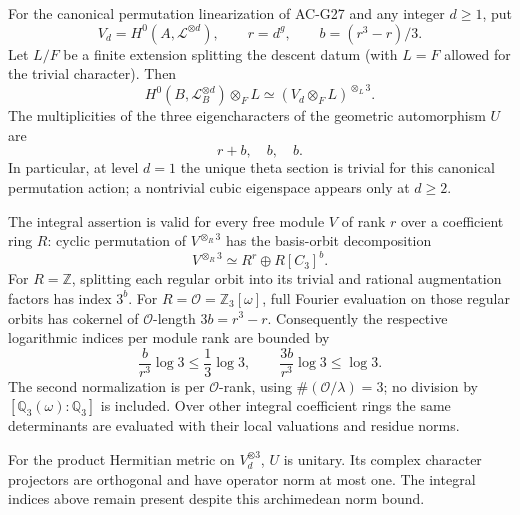 \begin{proposition}
\label{AC-G27-theta}
For the canonical permutation linearization of AC-G27 and any
integer $d\geq1$, put
\[
 V_d=H^0(A,\mathcal L^{\otimes d}),\qquad
 r=d^g,\qquad b=(r^3-r)/3.
\]
Let $L/F$ be a finite extension splitting the descent datum
(with $L=F$ allowed for the trivial character).  Then
\[
 H^0(B,\mathcal L_B^{\otimes d})\otimes_F L
          \simeq (V_d\otimes_F L)^{\otimes_L3}.          \tag{G27.5}
\]
The multiplicities of the three eigencharacters of the geometric
automorphism $U$ are
\[
                    r+b,\quad b,\quad b.               \tag{G27.6}
\]
In particular, at level $d=1$ the unique theta section is
trivial for this canonical permutation action; a nontrivial
cubic eigenspace appears only at $d\geq2$.

The integral assertion is valid for every free module $V$ of
rank $r$ over a coefficient ring $R$: cyclic permutation of
$V^{\otimes_R3}$ has the basis-orbit decomposition
\[
 V^{\otimes_R3}\simeq R^r\oplus R[C_3]^b.             \tag{G27.7}
\]
For $R=\mathbb Z$, splitting each regular orbit into its
trivial and rational augmentation factors has index $3^b$.
For $R=\mathcal O=\mathbb Z_3[\omega]$, full Fourier
evaluation on those regular orbits has cokernel of
$\mathcal O$-length $3b=r^3-r$.
Consequently the respective logarithmic indices per module rank
are bounded by
\[
 \frac{b}{r^3}\log3\leq\frac13\log3,
 \qquad
 \frac{3b}{r^3}\log3\leq\log3.                       \tag{G27.8}
\]
The second normalization is per $\mathcal O$-rank, using
$\#(\mathcal O/\lambda)=3$; no division by
$[\mathbb Q_3(\omega):\mathbb Q_3]$ is included.
Over other integral coefficient rings the same determinants
are evaluated with their local valuations and residue norms.

For the product Hermitian metric on $V_d^{\otimes3}$, $U$ is
unitary.  Its complex character projectors are orthogonal and
have operator norm at most one.  The integral indices above
remain present despite this archimedean norm bound.
\end{proposition}
